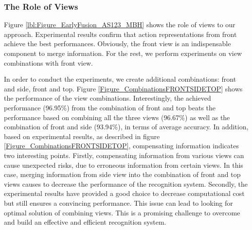 \documentclass[final,3p,times,twocolumn]{elsarticle}
\begin{document}
\subsubsection{The Role of Views}

Figure \ref{lbl:Figure_EarlyFusion_AS123_MBH} shows the role of views to our approach.
Experimental results confirm that action representations from front achieve the best performances. Obviously, the front view is an indispensable component to merge information.
For the rest, we perform experiments on view combinations with front view.

In order to conduct the experiments, we create additional combinations: front and side, front and top.
Figure \ref{Figure_CombinationsFRONTSIDETOP} shows the performance of the view combinations.
Interestingly, the achieved performance (96.95\%) from the combination of front and top beats the performance based on combining all the three views (96.67\%) as well as the combination of front and side (93.94\%), in terms of average accuracy.
In addition, based on experimental results, as described in figure \ref{Figure_CombinationsFRONTSIDETOP}, compensating information indicates two interesting points.
Firstly, compensating information from various views can cause unexpected risks, due to erroneous information from certain views.
In this case, merging information from side view into the combination of front and top views causes to decrease the performance of the recognition system.
Secondly, the experimental results have provided a good choice to decrease computational cost but still ensures a convincing performance.
This issue can lead to looking for optimal solution of combining views.
This is a promising challenge to overcome and build an effective and efficient recognition system.
\end{document}
